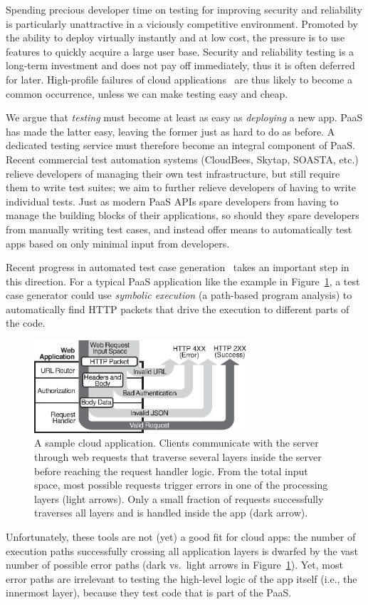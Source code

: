 Spending precious developer time on testing for improving security and reliability is particularly unattractive in a viciously competitive environment.  Promoted by the ability to deploy virtually instantly and at low cost, the pressure is to use features to quickly acquire a large user base. Security and reliability testing is a long-term investment and does not pay off immediately, thus it is often deferred for later.
%
High-profile failures of cloud applications~\cite{bugs-linkedin,bugs-gmail} are thus likely to become a common occurrence, unless we can make testing easy and cheap.

We argue that {\em testing} must become at least as easy as {\em deploying} a new app. PaaS has made the latter easy, leaving the former just as hard to do as before.  A dedicated testing service must therefore become an integral component of PaaS.
%
Recent commercial test automation systems (CloudBees, Skytap, SOASTA, etc.) relieve developers of managing their own test infrastructure, but still require them to write test suites; we aim to further relieve developers of having to write individual tests.
%
Just as modern PaaS APIs spare developers from having to manage the building blocks of their applications, so should they spare developers from manually writing test cases, and instead offer means to automatically test apps based on only minimal input from developers.

Recent progress in automated test case generation~\cite{klee,godefroid:fuzz,tillmann-pex} takes an important step in this direction.  For a typical PaaS application like the example in Figure~\ref{fig:running-example}, a test case generator could use \textit{symbolic execution} (a path-based program analysis) to automatically find HTTP packets that drive the execution to different parts of the code.
%
\begin{figure}
  \centering
  \includegraphics[width=3.1in]{paas/figures/web-flow}
  \caption{A sample cloud application.  Clients communicate with the server through web requests that traverse several layers inside the server before reaching the request handler logic.  From the total input space, most possible requests trigger errors in one of the processing layers (light arrows).  Only a small fraction of requests successfully traverses all layers and is handled inside the app (dark arrow).}
  \label{fig:running-example}
  \vspace{5pt}
\end{figure}
%
Unfortunately, these tools are not (yet) a good fit for cloud apps: the number of execution paths successfully crossing all application layers is dwarfed by the vast number of possible error paths (dark vs.~light arrows in Figure~\ref{fig:running-example}).  Yet, most error paths are irrelevant to testing the high-level logic of the app itself (i.e., the innermost layer), because they test code that is part of the PaaS.

